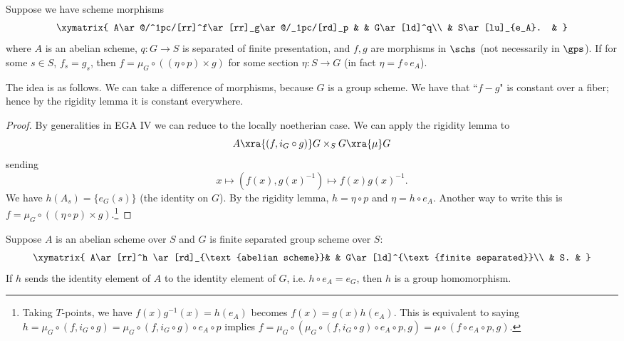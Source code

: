 \begin{cor}
Suppose we have scheme morphisms
\[
\xymatrix{
A\ar@/^1pc/[rr]^f\ar[rr]_g\ar@/_1pc/[rd]_p & & G\ar[ld]^q\\
& S\ar[lu]_{e_A}. & }
\]
where $A$ is an abelian scheme, $q:G\to S$ is separated of finite presentation, and $f,g$ are morphisms in $\schs$ (not necessarily in $\gps$). If for some $s\in S$, $f_s=g_s$, then $f=\mu_{G}\circ ((\eta\circ p)\times g)$ for some section $\eta:S\to G$ (in fact $\eta=f\circ e_A$).
\end{cor}
The idea is as follows. We can take a difference of morphisms, because $G$ is a group scheme. We have that ``$f-g$" is constant over a fiber; hence by the rigidity lemma it is constant everywhere.
\begin{proof}
By generalities in EGA IV we can reduce to the locally noetherian case. We can apply the rigidity lemma to 
\[
A\xra{(f,i_G\circ g)}  G\times_S G \xra{\mu} G
\]
sending
\[
x\mapsto (f(x),g(x)^{-1})\mapsto f(x)g(x)^{-1}.
\]
We have $h(A_s)=\{e_G(s)\}$ (the identity on $G$). By the rigidity lemma, $h=\eta\circ p$ and $\eta=h\circ e_A$. 
Another way to write this is $f=\mu_G\circ ((\eta\circ p)\times g)$.\footnote{Taking $T$-points, we have $f(x)g^{-1}(x)=h(e_A)$ becomes $f(x)=g(x)h(e_A)$. This is equivalent to saying $h=\mu_G\circ (f,i_G\circ g)=\mu_G\circ (f,i_G\circ g)\circ e_A\circ p$ implies $f=\mu_G\circ (\mu_G\circ (f,i_G\circ g)\circ e_A\circ p,g)=\mu\circ (f\circ e_A\circ p,g)$.} 
\end{proof}
\begin{cor}
Suppose $A$ is an abelian scheme over $S$ and $G$ is finite separated group scheme over $S$:
\[
\xymatrix{
A\ar[rr]^h \ar[rd]_{\text{abelian scheme}}& & G\ar[ld]^{\text{finite separated}}\\
& S. &
}
\]
If $h$ sends the identity element of $A$ to the identity element of $G$, i.e. $h\circ e_A=e_G$, then $h$ is a group homomorphism.
\end{cor}

